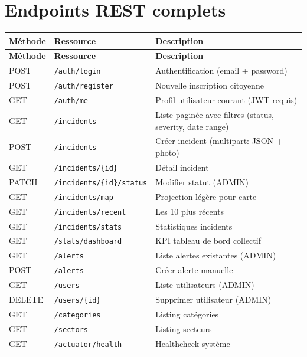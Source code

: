 \documentclass[12pt,a4paper,twoside,openright]{book}
\begin{document}
\appendix

\chapter{Endpoints REST complets}
\label{app:endpoints}
\begin{longtable}{@{}l l >{\RaggedRight\arraybackslash}p{7.5cm}@{}}
  \toprule
  \textbf{Méthode} & \textbf{Ressource} & \textbf{Description} \\
  \midrule
  \endfirsthead
  \toprule
  \textbf{Méthode} & \textbf{Ressource} & \textbf{Description} \\
  \midrule
  \endhead
  POST & \texttt{/auth/login} & Authentification (email + password) \\
  POST & \texttt{/auth/register} & Nouvelle inscription citoyenne \\
  GET & \texttt{/auth/me} & Profil utilisateur courant (JWT requis) \\
  GET & \texttt{/incidents} & Liste paginée avec filtres (status, severity, date range) \\
  POST & \texttt{/incidents} & Créer incident (multipart: JSON + photo) \\
  GET & \texttt{/incidents/\{id\}} & Détail incident \\
  PATCH & \texttt{/incidents/\{id\}/status} & Modifier statut (ADMIN) \\
  GET & \texttt{/incidents/map} & Projection légère pour carte \\
  GET & \texttt{/incidents/recent} & Les 10 plus récents \\
  GET & \texttt{/incidents/stats} & Statistiques incidents \\
  GET & \texttt{/stats/dashboard} & KPI tableau de bord collectif \\
  GET & \texttt{/alerts} & Liste alertes existantes (ADMIN) \\
  POST & \texttt{/alerts} & Créer alerte manuelle \\
  GET & \texttt{/users} & Liste utilisateurs (ADMIN) \\
  DELETE & \texttt{/users/\{id\}} & Supprimer utilisateur (ADMIN) \\
  GET & \texttt{/categories} & Listing catégories \\
  GET & \texttt{/sectors} & Listing secteurs \\
  GET & \texttt{/actuator/health} & Healthcheck système \\
  \bottomrule
\end{longtable}
\end{document}
